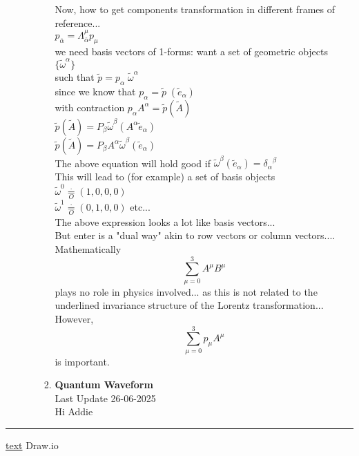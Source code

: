 \documentclass[11pt,a4paper]{article}
\begin{document}
\begin{enumerate}
\begin{enumerate}
\begin{enumerate}
			                  Now, how to get components transformation in different frames of reference...\\
			                  $p_{\overline{\alpha}} = \Lambda^{\mu}_{\overline{\alpha}} p_{\mu}$\\
			                  we need basis vectors of 1-forms: want a set of geometric objects\\
			                  $\{ \tilde{\omega}^\alpha\}$\\ such that $ \tilde{p}= p_\alpha\; \tilde{\omega}^\alpha$\\
			                  since we know that $p_\alpha = \widetilde{p}\; (\widetilde{e}_\alpha)$\\
			                  with contraction $p_\alpha A^\alpha = \widetilde{p} (\widetilde{A})$\\
			                  $\widetilde{p} (\widetilde{A}) = P_\beta \tilde{\omega}^\beta ( A^\alpha \tilde{e}_\alpha )$\\
			                  $\widetilde{p} (\widetilde{A}) = P_\beta A^\alpha \tilde{\omega}^\beta ( \tilde{e}_\alpha )$\\
			                  The above equation will hold good if $\tilde{\omega}^\beta ( \tilde{e}_\alpha ) = {\delta_\alpha}^\beta $\\
			                  This will lead to (for example) a set of basis objects\\
			                  $\tilde{\omega}^0 \mathop = \limits^{\cdot}_{O} (1,0,0,0)$\\
			                  $\tilde{\omega}^1 \mathop = \limits^{\cdot}_{O} (0,1,0,0)$ etc...\\
			                  The above expression looks a lot like basis vectors...\\
			                  But enter is a "dual way" akin to row vectors or column vectors....\\
			                  Mathematically \[ \sum_{\mu=0}^{3}A^\mu B^\mu \] plays no role in physics involved... as this is not related to the underlined invariance structure of the Lorentz transformation...\\
			                  However, \[ \sum_{\mu=0}^{3} p_\mu A^\mu\] is important.\\
			            \item \textbf{Quantum Waveform}\\



			                  Last Update 26-06-2025\\
			                  Hi Addie\\
		            \end{enumerate}
	      \end{enumerate}
\end{enumerate}
\noindent\rule{\textwidth}{1pt}
\href{https://youtu.be/TiHHz3sKDbY?list=PL6Q1107aDr%SgQ1DBEugejXLfQX76hfSnX&t=1188}{text} Draw.io
\end{document}
